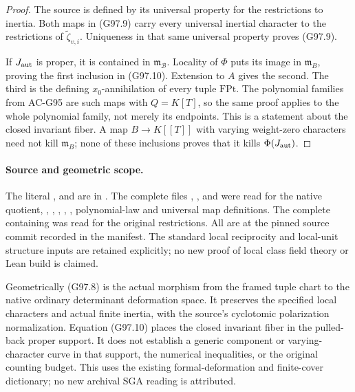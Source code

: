 \begin{proof}
The source  is defined by its
universal property for the restrictions to inertia.
Both maps in (G97.9) carry every universal inertial
character to the restrictions of
\(\widetilde\zeta_{v,i}\).  Uniqueness in that same
universal property proves (G97.9).

If \(J_{\rm aut}\) is proper, it is contained in
\(\mathfrak m_{\mathscr B}\).  Locality of \(\Phi\)
puts its image in \(\mathfrak m_B\), proving the
first inclusion in (G97.10).  Extension to \(A\)
gives the second.  The third is the defining
\(x_0\)-annihilation of every tuple \(\mathrm{FPt}\).
The polynomial families from AC-G95 are such maps
with \(Q=K[T]\), so the same proof applies to the
whole polynomial family, not merely its endpoints.
This is a statement about the closed invariant
fiber.  A map \(B\to K[[T]]\) with varying
weight-zero characters need not kill
\(\mathfrak m_B\); none of these inclusions proves
that it kills \(\Phi(J_{\rm aut})\).
\end{proof}

\paragraph{Source and geometric scope.}
The literal ,  and  are
in .
The complete files ,
, and
 were read for the native quotient,
, , , ,
, polynomial-law and universal
map definitions.  The complete containing
 was read for the
original  restrictions.  All are at
the pinned source commit recorded in the manifest.
The standard local reciprocity and local-unit
structure inputs are retained explicitly; no new
proof of local class field theory or Lean build is
claimed.

Geometrically (G97.8) is the actual morphism from
the framed tuple chart to the native ordinary
determinant deformation space.  It preserves the
specified local characters and actual finite
inertia, with the source's cyclotomic polarization
normalization.  Equation (G97.10) places the closed
invariant fiber in the pulled-back proper support.
It does not establish a generic component or
varying-character curve in that support, the
numerical  inequalities, or the
original counting budget.  This uses the existing
formal-deformation and finite-cover dictionary;
no new archival SGA reading is attributed.
